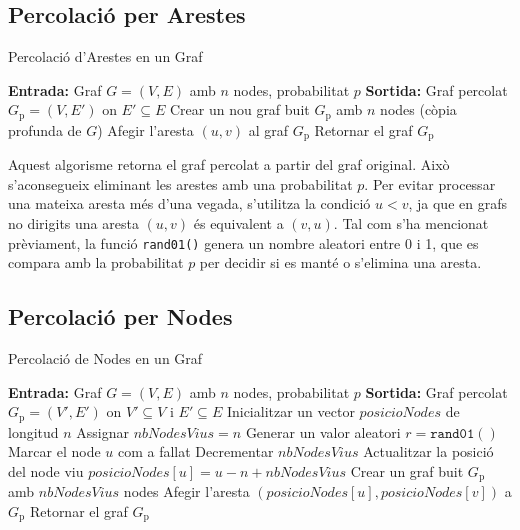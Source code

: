 \documentclass[a4paper]{article}
\begin{document}
	\subsection{Percolació per Arestes}
	\begin{algorithm} [H]
		\caption{Percolació d'Arestes en un Graf}
		\begin{algorithmic} [1]
			\Statex \textbf{Entrada:} Graf $G = (V, E)$ amb $n$ nodes, probabilitat $p$
			\Statex \textbf{Sortida:} Graf percolat $G_{\text{p}} = (V, E')$ on $E' \subseteq E$
			\Statex \vspace{-0.25em}
			\State Crear un nou graf buit $G_{\text{p}}$ amb $n$ nodes (còpia profunda de $G$)
						\State Afegir l'aresta $(u, v)$ al graf $G_{\text{p}}$
					\EndIf
				\EndFor
			\EndFor
			\State Retornar el graf $G_{\text{p}}$
		\end{algorithmic}
	\end{algorithm}

	Aquest algorisme retorna el graf percolat a partir del graf original. Això s'aconsegueix eliminant les arestes amb una probabilitat $p$. Per evitar processar una mateixa aresta més d'una vegada, s'utilitza la condició $u < v $, ja que en grafs no dirigits una aresta $(u, v)$ és equivalent a $(v, u)$. Tal com s'ha mencionat prèviament, la funció \texttt{rand01()} genera un nombre aleatori entre 0 i 1, que es compara amb la probabilitat $p$ per decidir si es manté o s'elimina una aresta.

	\subsection{Percolació per Nodes}
	\begin{algorithm} [H]
		\caption{Percolació de Nodes en un Graf}
		\begin{algorithmic} [1]
			\Statex \textbf{Entrada:} Graf $G = (V, E)$ amb $n$ nodes, probabilitat $p$
			\Statex \textbf{Sortida:} Graf percolat $G_{\text{p}} = (V', E')$ on $V' \subseteq V$ i $E' \subseteq E$
			\Statex \vspace{-0.25em}
			\State Inicialitzar un vector $posicioNodes$ de longitud $n$
			\State Assignar $nbNodesVius = n$
				\State Generar un valor aleatori $r = \texttt{rand01}()$
					\State Marcar el node $u$ com a fallat
					\State Decrementar $nbNodesVius$
				\Else
					\State Actualitzar la posició del node viu $posicioNodes[u] = u - n + nbNodesVius$
				\EndIf
			\EndFor
			\Statex
			\State Crear un graf buit $G_{\text{p}}$ amb $nbNodesVius$ nodes
							\State Afegir l'aresta $(posicioNodes[u], posicioNodes[v])$ a $G_{\text{p}}$
						\EndIf
					\EndFor
				\EndIf
			\EndFor
			\State Retornar el graf $G_{\text{p}}$
		\end{algorithmic}
	\end{algorithm}
\end{document}
